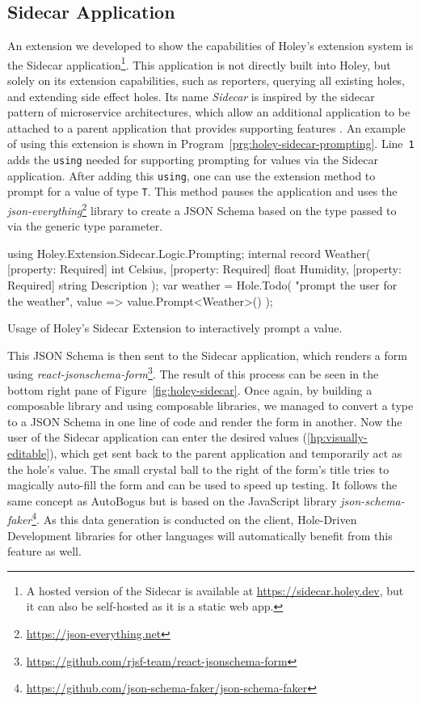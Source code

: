 \subsection{Sidecar Application}
\label{sec:holey-sidecar}
An extension we developed to show the capabilities of Holey's extension system is the Sidecar application\footnote{A hosted version of the Sidecar is available at \url{https://sidecar.holey.dev}, but it can also be self-hosted as it is a static web app.}.
This application is not directly built into Holey, but solely on its extension capabilities, such as reporters, querying all existing holes, and extending side effect holes.
Its name \emph{Sidecar} is inspired by the sidecar pattern of microservice architectures, which allow an additional application to be attached to a parent application that provides supporting features \cite{microsoft_sidecar_nodate}.
An example of using this extension is shown in Program~\ref{prg:holey-sidecar-prompting}.
Line~\verb|1| adds the \verb|using| needed for supporting prompting for values via the Sidecar application.
After adding this \verb|using|, one can use the extension method \texttt{} to prompt for a value of type \verb|T|.
This method pauses the application and uses the \emph{json-everything}\footnote{\url{https://json-everything.net}} library to create a JSON Schema based on the type passed to \texttt{} via the generic type parameter.
%
\begin{program}[ht]
\begin{CsCode}
using Holey.Extension.Sidecar.Logic.Prompting;
internal record Weather(
	[property: Required] int Celsius,
	[property: Required] float Humidity,
	[property: Required] string Description
);
var weather = Hole.Todo(
	"prompt the user for the weather",
	value => value.Prompt<Weather>()
);
\end{CsCode}
\caption{Usage of Holey's Sidecar Extension to interactively prompt a value.}
\label{prg:holey-sidecar-prompting}
\end{program}
%
This JSON Schema is then sent to the Sidecar application, which renders a form using \emph{react-jsonschema-form}\footnote{\url{https://github.com/rjsf-team/react-jsonschema-form}}.
The result of this process can be seen in the bottom right pane of Figure~\ref{fig:holey-sidecar}.
Once again, by building a composable library and using composable libraries, we managed to convert a type to a JSON Schema in one line of code and render the form in another.
Now the user of the Sidecar application can enter the desired values (\ref{hp:visually-editable}), which get sent back to the parent application and temporarily act as the hole's value.
The small crystal ball to the right of the form's title tries to magically auto-fill the form and can be used to speed up testing.
It follows the same concept as AutoBogus but is based on the JavaScript library \emph{json-schema-faker}\footnote{\url{https://github.com/json-schema-faker/json-schema-faker}}.
As this data generation is conducted on the client, Hole-Driven Development libraries for other languages will automatically benefit from this feature as well.

